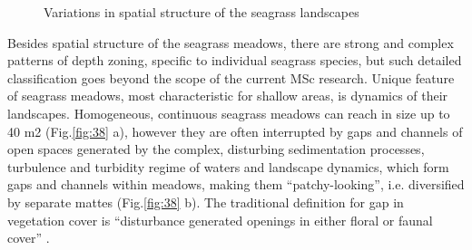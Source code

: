\documentclass[10pt, a4paper]{article}
\begin{document}
\begin{figure}[h]
	\centering
	\caption{Variations in spatial structure of the seagrass landscapes}
	\label{fig:41}
\end{figure}

Besides spatial structure of the seagrass meadows, there are strong and complex patterns of depth zoning, specific to individual
seagrass species, but such detailed classification goes beyond the scope of the current MSc research.
Unique feature of seagrass meadows, most characteristic for shallow areas, is dynamics of their
landscapes. Homogeneous, continuous seagrass meadows can reach in size up to 40 m2 (Fig.\ref{fig:38} a),
however they are often interrupted by gaps and channels of open spaces generated by the complex,
disturbing sedimentation processes, turbulence and turbidity regime of waters and landscape dynamics,
which form gaps and channels within meadows, making them “patchy-looking”, i.e. diversified by
separate mattes (Fig.\ref{fig:38} b). The traditional definition for gap in vegetation cover is “disturbance generated
openings in either floral or faunal cover” \cite{Connell78}\label{Connell78}.
\end{document}
